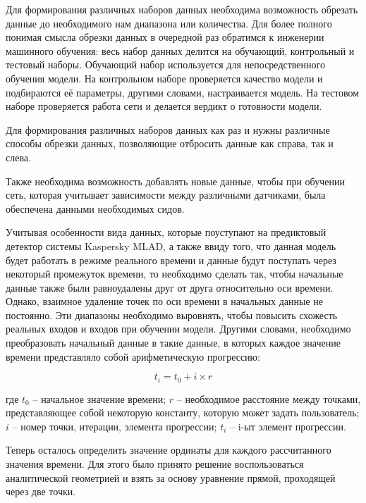 {  \par \redline Для формирования различных наборов данных необходима возможность обрезать данные до необходимого нам диапазона или количества. Для более полного понимая смысла обрезки данных в очередной раз обратимся к инженерии машинного обучения: весь набор данных делится на обучающий, контрольный и тестовый наборы. Обучающий набор используется для непосредственного обучения модели. На контрольном наборе проверяется качество модели и подбираются её параметры, другими словами, настраивается модель. На тестовом наборе проверяется работа сети и делается вердикт о готовности модели. 

  \par \redline Для формирования различных наборов данных как раз и нужны различные способы обрезки данных, позволяющие отбросить данные как справа, так и слева. 
 
  \par \redline Также необходима возможность добавлять новые данные, чтобы при обучении сеть, которая учитывает зависимости между различными датчиками, была обеспечена данными необходимых сидов.  

  \par \redline Учитывая особенности вида данных, которые поуступают на предиктовый детектор системы Kaspersky MLAD, а также ввиду того, что данная модель будет работать в режиме реального времени и данные будут поступать через некоторый промежуток времени, то необходимо сделать так, чтобы начальные данные также были равноудалены друг от друга относительно оси времени. Однако, взаимное удаление точек по оси времени в начальных данные не постоянно. Эти диапазоны необходимо выровнять, чтобы повысить схожесть реальных входов и входов при обучении модели. Другими словами, необходимо преобразовать начальный данные в такие данные, в которых каждое значение времени представляло собой арифметическую прогрессию:

  \[t_i = t_0 + i \times r\]

  где $t_0$ {--} начальное значение времени; $r$ {--} необходимое расстояние между точками, представляющее собой некоторую константу, которую может задать пользователь; $i$ 
  {--} номер точки, итерации, элемента прогрессии; $t_i$ {--} i-ыт элемент прогрессии. 

  \par \redline Теперь осталось определить значение ординаты для каждого рассчитанного значения времени. Для этого было принято решение воспользоваться аналитической геометрией и взять за основу уравнение прямой, проходящей через две точки.  

}
